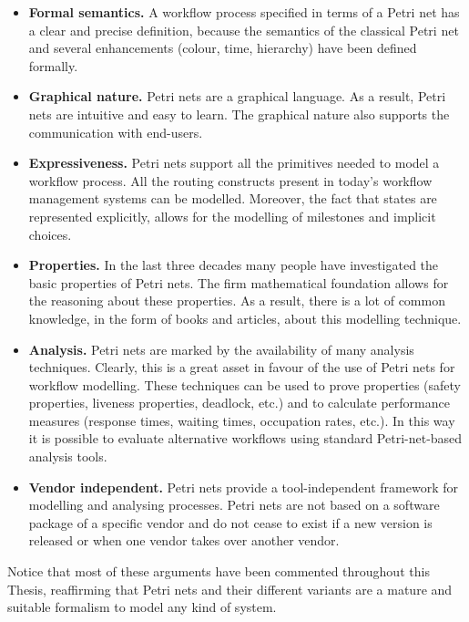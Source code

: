 \begin{itemize}
\item {\bf Formal semantics.}
A workflow process specified in terms of a Petri net has a clear and precise
definition, because the semantics of the classical Petri net and several 
enhancements (colour, time, hierarchy) have been defined formally.

\item {\bf Graphical nature.}
Petri nets are a graphical language. As a result, Petri nets are intuitive and
easy to learn. The graphical nature also supports the communication with
end-users.

\item {\bf Expressiveness.}
Petri nets support all the primitives needed to model a workflow process. All
the routing constructs present in today’s workflow management systems can
be modelled. Moreover, the fact that states are represented explicitly, allows
for the modelling of milestones and implicit choices.

\item {\bf Properties.}
In the last three decades many people have investigated the basic properties
of Petri nets. The firm mathematical foundation allows for the reasoning
about these properties. As a result, there is a lot of common knowledge, in
the form of books and articles, about this modelling technique.

\item {\bf Analysis.}
Petri nets are marked by the availability of many analysis techniques. Clearly,
this is a great asset in favour of the use of Petri nets for workflow modelling.
These techniques can be used to prove properties (safety properties, 
liveness properties, deadlock, etc.) and to calculate performance measures 
(response times, waiting times, occupation rates, etc.). In this way it is possible
to evaluate alternative workflows using standard Petri-net-based analysis
tools.

\item {\bf Vendor independent.}
Petri nets provide a tool-independent framework for modelling and analysing
processes. Petri nets are not based on a software package of a specific vendor
and do not cease to exist if a new version is released or when one vendor takes
over another vendor.

\end{itemize}

Notice that most of these arguments have been commented throughout this Thesis, reaffirming that
Petri nets and their different variants are a mature and suitable formalism to model any kind
of system.

